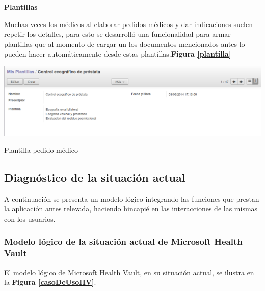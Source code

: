 \textbf{Plantillas}

Muchas veces los médicos al elaborar pedidos médicos y dar indicaciones suelen repetir los detalles, para esto se desarrolló una funcionalidad para armar plantillas que al momento de cargar un los documentos mencionados antes lo pueden hacer automáticamente desde estas plantillas.\textbf{Figura \ref{plantilla}}


\begin{correccionFigure}[h]
      \centering
      \includegraphics[width=.8\textwidth]{img/tp1/HE/PlantillaPM}
      \caption{Plantilla pedido médico}
      \label{plantilla}
\end{correccionFigure}

\subsection{Diagnóstico de la situación actual}
A continuación se presenta un modelo lógico integrando las funciones que prestan la aplicación antes relevada, haciendo hincapié en las interacciones de las mismas con los usuarios.


\subsubsection{Modelo lógico de la situación actual de Microsoft Health Vault}

El modelo lógico de Microsoft Health Vault, en su situación actual, se ilustra en la \textbf{Figura \ref{casoDeUsoHV}}.


